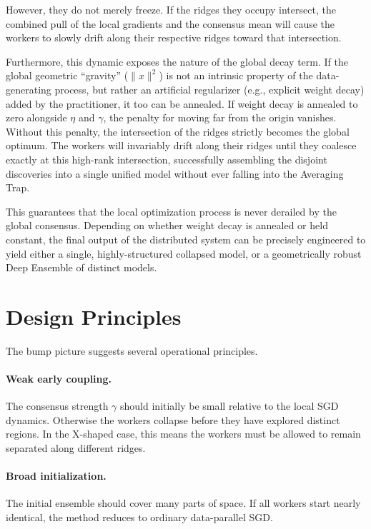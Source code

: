\documentclass{article}
\begin{document}
However, they do not merely freeze. If the ridges they occupy intersect, the combined pull of the local gradients and the consensus mean will cause the workers to slowly drift along their respective ridges toward that intersection. 

Furthermore, this dynamic exposes the nature of the global decay term. If the global geometric ``gravity'' ($\|x\|^2$) is not an intrinsic property of the data-generating process, but rather an artificial regularizer (e.g., explicit weight decay) added by the practitioner, it too can be annealed. If weight decay is annealed to zero alongside $\eta$ and $\gamma$, the penalty for moving far from the origin vanishes. Without this penalty, the intersection of the ridges strictly becomes the global optimum. The workers will invariably drift along their ridges until they coalesce exactly at this high-rank intersection, successfully assembling the disjoint discoveries into a single unified model without ever falling into the Averaging Trap.

This guarantees that the local optimization process is never derailed by the global consensus. Depending on whether weight decay is annealed or held constant, the final output of the distributed system can be precisely engineered to yield either a single, highly-structured collapsed model, or a geometrically robust Deep Ensemble of distinct models.

\section{Design Principles}

The bump picture suggests several operational principles.

\paragraph{Weak early coupling.}
The consensus strength $\gamma$ should initially be small relative to
the local SGD dynamics. Otherwise the workers collapse before they have
explored distinct regions. In the X-shaped case, this means the workers
must be allowed to remain separated along different ridges.

\paragraph{Broad initialization.}
The initial ensemble should cover many parts of space. If all workers
start nearly identical, the method reduces to ordinary data-parallel
SGD.
\end{document}
